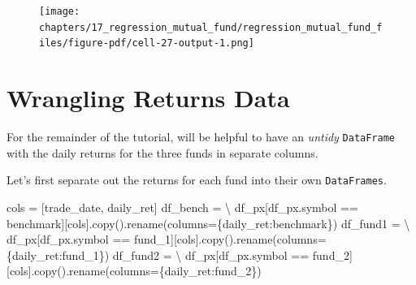 \documentclass[
  letterpaper,
  DIV=11,
  numbers=noendperiod]{scrreprt}
\newenvironment{Shaded}{\begin{snugshade}}{\end{snugshade}}
\newcommand{\NormalTok}[1]{\textcolor[rgb]{0.00,0.23,0.31}{#1}}
\newcommand{\OperatorTok}[1]{\textcolor[rgb]{0.37,0.37,0.37}{#1}}
\newcommand{\StringTok}[1]{\textcolor[rgb]{0.13,0.47,0.30}{#1}}
\begin{document}
\begin{figure}[H]

{\centering \texttt{[image: chapters/17\_regression\_mutual\_fund/regression\_mutual\_fund\_files/figure-pdf/cell-27-output-1.png]}

}

\end{figure}

\hypertarget{wrangling-returns-data}{%
\section{Wrangling Returns Data}\label{wrangling-returns-data}}

For the remainder of the tutorial, will be helpful to have an
\emph{untidy} \texttt{DataFrame} with the daily returns for the three
funds in separate columns.

Let's first separate out the returns for each fund into their own
\texttt{DataFrames}.

\begin{Shaded}
\begin{Highlighting}[]
\NormalTok{cols }\OperatorTok{=}\NormalTok{ [}\StringTok{\textquotesingle{}trade\_date\textquotesingle{}}\NormalTok{, }\StringTok{\textquotesingle{}daily\_ret\textquotesingle{}}\NormalTok{]}
\NormalTok{df\_bench }\OperatorTok{=} \OperatorTok{\textbackslash{}}
\NormalTok{    df\_px[df\_px.symbol }\OperatorTok{==} \StringTok{\textquotesingle{}benchmark\textquotesingle{}}\NormalTok{][cols].copy().rename(columns}\OperatorTok{=}\NormalTok{\{}\StringTok{\textquotesingle{}daily\_ret\textquotesingle{}}\NormalTok{:}\StringTok{\textquotesingle{}benchmark\textquotesingle{}}\NormalTok{\})}
\NormalTok{df\_fund1 }\OperatorTok{=} \OperatorTok{\textbackslash{}}
\NormalTok{    df\_px[df\_px.symbol }\OperatorTok{==} \StringTok{\textquotesingle{}fund\_1\textquotesingle{}}\NormalTok{][cols].copy().rename(columns}\OperatorTok{=}\NormalTok{\{}\StringTok{\textquotesingle{}daily\_ret\textquotesingle{}}\NormalTok{:}\StringTok{\textquotesingle{}fund\_1\textquotesingle{}}\NormalTok{\})}
\NormalTok{df\_fund2 }\OperatorTok{=} \OperatorTok{\textbackslash{}}
\NormalTok{    df\_px[df\_px.symbol }\OperatorTok{==} \StringTok{\textquotesingle{}fund\_2\textquotesingle{}}\NormalTok{][cols].copy().rename(columns}\OperatorTok{=}\NormalTok{\{}\StringTok{\textquotesingle{}daily\_ret\textquotesingle{}}\NormalTok{:}\StringTok{\textquotesingle{}fund\_2\textquotesingle{}}\NormalTok{\})}
\end{Highlighting}
\end{Shaded}
\end{document}
